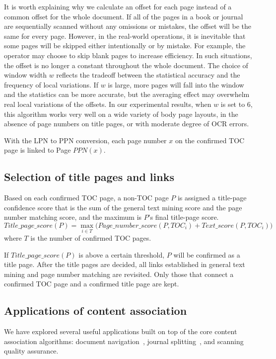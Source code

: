 \documentclass[10pt]{article}
\begin{document}
It is worth explaining why we calculate an offset for each page instead of a common offset for the whole document. If all of the pages in a book or journal are sequentially scanned without any omissions or mistakes, the offset will be the same for every page. However, in the real-world operations, it is inevitable that some pages will be skipped either intentionally or by mistake. For example, the operator may choose to skip blank pages to increase efficiency. In such situations, the offset is no longer a constant throughout the whole document. The choice of window width \(w\) reflects the tradeoff between the statistical accuracy and the frequency of local variations. If \(w\) is large, more pages will fall into the window and the statistics can be more accurate, but the averaging effect may overwhelm real local variations of the offsets. In our experimental results, when \(w\) is set to 6, this algorithm works very well on a wide variety of body page layouts, in the absence of page numbers on title pages, or with moderate degree of OCR errors.

With the LPN to PPN conversion, each page number \(x\) on the confirmed TOC page is linked to Page \(PPN(x)\).

\subsection{Selection of title pages and links}

Based on each confirmed TOC page, a non-TOC page \(P\) is assigned a title-page confidence score that is the sum of the general text mining score and the page number matching score, and the maximum is \(P\)'s final title-page score.
\[
Title\_page\_score(P) = \max_{i\in T}\big(Page\_number\_score(P,TOC_i) + Text\_score(P,TOC_i)\big) \tag{6}
\]
where \(T\) is the number of confirmed TOC pages.

If \(Title\_page\_score(P)\) is above a certain threshold, \(P\) will be confirmed as a title page. After the title pages are decided, all links established in general text mining and page number matching are revisited. Only those that connect a confirmed TOC page and a confirmed title page are kept.

\subsection{Applications of content association}

We have explored several useful applications built on top of the core content association algorithms: document navigation~\cite{Lin2004}, journal splitting~\cite{Lin2003}, and scanning quality assurance.
\end{document}
